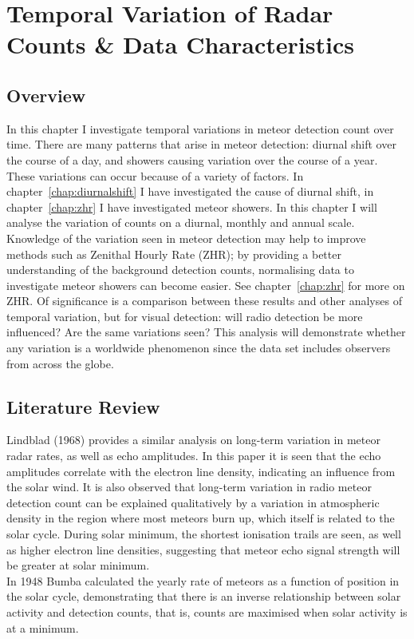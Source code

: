 \chapter{Temporal Variation of Radar Counts \& Data Characteristics}
\label{chap:temporal}
\begin{strip}
	\begin{minipage}{\textwidth}
		\begin{abstract}
			
		\end{abstract}
	\end{minipage}
\end{strip}
\section{Overview}
In this chapter I investigate temporal variations in meteor detection count over time. There are many patterns that arise in meteor detection: diurnal shift over the course of a day, and showers causing variation over the course of a year. These variations can occur because of a variety of factors. In chapter~\ref{chap:diurnalshift} I have investigated the cause of diurnal shift, in chapter~\ref{chap:zhr} I have investigated meteor showers. In this chapter I will analyse the variation of counts on a diurnal, monthly and annual scale.\\
Knowledge of the variation seen in meteor detection may help to improve methods such as Zenithal Hourly Rate (ZHR); by providing a better understanding of the background detection counts, normalising data to investigate meteor showers can become easier. See chapter~\ref{chap:zhr} for more on ZHR. Of significance is a comparison between these results and other analyses of temporal variation, but for visual detection: will radio detection be more influenced? Are the same variations seen? This analysis will demonstrate whether any variation is a worldwide phenomenon since the data set includes observers from across the globe.
\section{Literature Review}
Lindblad (1968) \cite{lindblad} provides a similar analysis on long-term variation in meteor radar rates, as well as echo amplitudes. In this paper it is seen that the echo amplitudes correlate with the electron line density, indicating an influence from the solar wind. It is also observed that long-term variation in radio meteor detection count can be explained qualitatively by a variation in atmospheric density in the region where most meteors burn up, which itself is related to the solar cycle. During solar minimum, the shortest ionisation trails are seen, as well as higher electron line densities, suggesting that meteor echo signal strength will be greater at solar minimum.\\
In 1948 Bumba \cite{bumba} calculated the yearly rate of meteors as a function of position in the solar cycle, demonstrating that there is an inverse relationship between solar activity and detection counts, that is, counts are maximised when solar activity is at a minimum.
